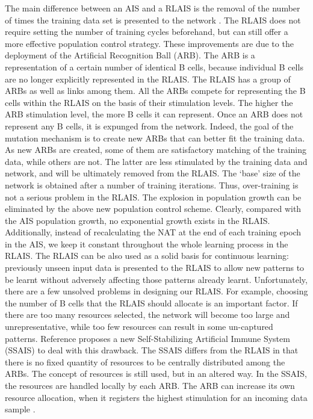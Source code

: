\documentclass{article}
\begin{document}
\begin{itemize}
{    The main difference between an AIS and a RLAIS is the removal of the number of times the training data set is  presented to the network . The RLAIS does not require setting the number of training cycles beforehand, but can still offer a more effective population control strategy. These improvements are due to the deployment of the Artificial Recognition Ball (ARB). The ARB is a representation of a certain number of identical B cells, because individual B cells are no longer explicitly represented in the RLAIS. The RLAIS has a group of ARBs as well as links among them. All the ARBs compete for representing the B cells within the RLAIS on the basis of their stimulation levels. The higher the ARB stimulation level, the more B cells it can represent. Once an ARB does not represent any B cells, it is expunged from the network. Indeed, the goal of the mutation mechanism is to create new ARBs that can better fit the training data. As new ARBs are created, some of them are satisfactory matching of the training data, while others are not. The latter are less stimulated by the training data and network, and will be ultimately removed from the RLAIS. The ‘base’ size of the network is obtained after a number of training iterations. Thus, over-training is not a serious problem in the RLAIS. The explosion in population growth can be eliminated by the above new population control scheme. Clearly, compared with the AIS population growth, no exponential growth exists in the RLAIS. Additionally, instead of recalculating the NAT at the end of each training epoch in the AIS, we keep it constant throughout the whole learning process in the RLAIS. The RLAIS can be also used as a solid basis for continuous learning: previously unseen input data is presented to the 
RLAIS to allow new patterns to be learnt without adversely affecting those patterns already learnt. Unfortunately, there are a few unsolved problems in designing our RLAIS. For example, choosing the number of B cells that the RLAIS should allocate is an important factor. If there are too many resources selected, the network will become too large and unrepresentative, while too few resources can result in some un-captured patterns. Reference proposes a new Self-Stabilizing Artificial Immune System (SSAIS) to deal with this drawback. The SSAIS differs from the RLAIS in that there is no fixed quantity of resources to be centrally distributed among the ARBs. The concept of resources is still used, but in an altered way. In the SSAIS, the resources are handled locally by each ARB. The ARB can increase its own resource allocation, when it registers the highest stimulation for an incoming data sample .

    }
\end{itemize}
\end{document}
